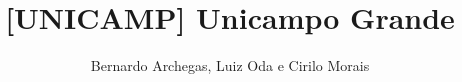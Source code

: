 \documentclass[12pt, a4paper, twoside]{article}
\title{[UNICAMP] Unicampo Grande}
\author{Bernardo Archegas, Luiz Oda e Cirilo Morais}
\begin{document}
\twocolumn
\date{} %
\maketitle


\renewcommand{\contentsname}{Índice} %
\tableofcontents
\end{document}
